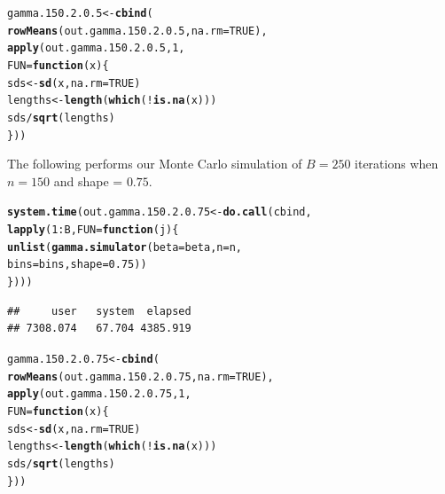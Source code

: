 \documentclass[11pt]{article}\usepackage[]{graphicx}\usepackage[]{color}
\makeatletter
\newcommand{\hlnum}[1]{\textcolor[rgb]{0.686,0.059,0.569}{#1}}%
\newcommand{\hlopt}[1]{\textcolor[rgb]{0,0,0}{#1}}%
\newcommand{\hlstd}[1]{\textcolor[rgb]{0.345,0.345,0.345}{#1}}%
\newcommand{\hlkwa}[1]{\textcolor[rgb]{0.161,0.373,0.58}{\textbf{#1}}}%
\newcommand{\hlkwb}[1]{\textcolor[rgb]{0.69,0.353,0.396}{#1}}%
\newcommand{\hlkwc}[1]{\textcolor[rgb]{0.333,0.667,0.333}{#1}}%
\newcommand{\hlkwd}[1]{\textcolor[rgb]{0.737,0.353,0.396}{\textbf{#1}}}%
\newenvironment{kframe}{%
 \def\at@end@of@kframe{}%
 \ifinner\ifhmode%
  \def\at@end@of@kframe{\end{minipage}}%
  \begin{minipage}{\columnwidth}%
 \fi\fi%
 \def\FrameCommand##1{\hskip\@totalleftmargin \hskip-\fboxsep
 \colorbox{shadecolor}{##1}\hskip-\fboxsep
     \hskip-\linewidth \hskip-\@totalleftmargin \hskip\columnwidth}%
 \MakeFramed {\advance\hsize-\width
   \@totalleftmargin\z@ \linewidth\hsize
   \@setminipage}}%
 {\par\unskip\endMakeFramed%
 \at@end@of@kframe}
\newenvironment{knitrout}{}{} %
\makeatother
\begin{document}
\begin{knitrout}
\color{fgcolor}\begin{kframe}
\begin{alltt}
\hlstd{gamma.150.2.0.5} \hlkwb{<-} \hlkwd{cbind}\hlstd{(}
  \hlkwd{rowMeans}\hlstd{(out.gamma.150.2.0.5,} \hlkwc{na.rm} \hlstd{=} \hlnum{TRUE}\hlstd{),}
  \hlkwd{apply}\hlstd{(out.gamma.150.2.0.5,} \hlnum{1}\hlstd{,}
  \hlkwc{FUN} \hlstd{=} \hlkwa{function}\hlstd{(}\hlkwc{x}\hlstd{)\{}
    \hlstd{sds} \hlkwb{<-} \hlkwd{sd}\hlstd{(x,} \hlkwc{na.rm} \hlstd{=} \hlnum{TRUE}\hlstd{)}
    \hlstd{lengths} \hlkwb{<-} \hlkwd{length}\hlstd{(}\hlkwd{which}\hlstd{(}\hlopt{!}\hlkwd{is.na}\hlstd{(x)))}
    \hlstd{sds} \hlopt{/} \hlkwd{sqrt}\hlstd{(lengths)}
  \hlstd{\}))}
\end{alltt}
\end{kframe}
\end{knitrout}

The following performs our Monte Carlo simulation of $B = 250$ iterations 
when $n = 150$ and shape = $0.75$.

\begin{knitrout}
\color{fgcolor}\begin{kframe}
\begin{alltt}
\hlkwd{system.time}\hlstd{(out.gamma.150.2.0.75} \hlkwb{<-} \hlkwd{do.call}\hlstd{(cbind,}
  \hlkwd{lapply}\hlstd{(}\hlnum{1}\hlopt{:}\hlstd{B,} \hlkwc{FUN} \hlstd{=} \hlkwa{function}\hlstd{(}\hlkwc{j}\hlstd{)\{}
    \hlkwd{unlist}\hlstd{(}\hlkwd{gamma.simulator}\hlstd{(}\hlkwc{beta} \hlstd{= beta,} \hlkwc{n} \hlstd{= n,}
      \hlkwc{bins} \hlstd{= bins,} \hlkwc{shape} \hlstd{=} \hlnum{0.75}\hlstd{))}
\hlstd{\})))}
\end{alltt}
\begin{verbatim}
##     user   system  elapsed 
## 7308.074   67.704 4385.919
\end{verbatim}
\end{kframe}
\end{knitrout}

\begin{knitrout}
\color{fgcolor}\begin{kframe}
\begin{alltt}
\hlstd{gamma.150.2.0.75} \hlkwb{<-} \hlkwd{cbind}\hlstd{(}
  \hlkwd{rowMeans}\hlstd{(out.gamma.150.2.0.75,} \hlkwc{na.rm} \hlstd{=} \hlnum{TRUE}\hlstd{),}
  \hlkwd{apply}\hlstd{(out.gamma.150.2.0.75,} \hlnum{1}\hlstd{,}
  \hlkwc{FUN} \hlstd{=} \hlkwa{function}\hlstd{(}\hlkwc{x}\hlstd{)\{}
    \hlstd{sds} \hlkwb{<-} \hlkwd{sd}\hlstd{(x,} \hlkwc{na.rm} \hlstd{=} \hlnum{TRUE}\hlstd{)}
    \hlstd{lengths} \hlkwb{<-} \hlkwd{length}\hlstd{(}\hlkwd{which}\hlstd{(}\hlopt{!}\hlkwd{is.na}\hlstd{(x)))}
    \hlstd{sds} \hlopt{/} \hlkwd{sqrt}\hlstd{(lengths)}
  \hlstd{\}))}
\end{alltt}
\end{kframe}
\end{knitrout}
\end{document}
